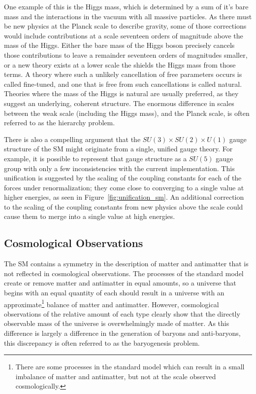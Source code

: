 One example of this is the Higgs mass, which is determined by a sum of it's bare mass and the interactions in the vacuum with all massive particles.
As there must be new physics at the Planck scale to describe gravity, some of those corrections would include contributions at a scale seventeen orders of magnitude above the mass of the Higgs.
Either the bare mass of the Higgs boson precisely cancels those contributions to leave a remainder seventeen orders of magnitudes smaller, or a new theory exists at a lower scale the shields the Higgs mass from those terms.
A theory where such a unlikely cancellation of free parameters occurs is called fine-tuned, and one that is free from such cancellations is called natural.
Theories where the mass of the Higgs is natural are usually preferred, as they suggest an underlying, coherent structure.
The enormous difference in scales between the weak scale (including the Higgs mass), and the Planck scale, is often referred to as the hierarchy problem.

There is also a compelling argument that the $SU(3)\times SU(2) \times U(1)$ gauge structure of the \ac{SM} might originate from a single, unified gauge theory.
For example, it is possible to represent that gauge structure as a $SU(5)$ gauge group with only a few inconsistencies with the current implementation.
This unification is suggested by the scaling of the coupling constants for each of the forces under renormalization; they come close to converging to a single value at higher energies, as seen in Figure~\ref{fig:unification_sm}. 
An additional correction to the scaling of the coupling constants from new physics above the \TeV scale could cause them to merge into a single value at high energies. 

\subsection{Cosmological Observations}

The \ac{SM} contains a symmetry in the description of matter and antimatter that is not reflected in cosmological observations.
The processes of the standard model create or remove matter and antimatter in equal amounts, so a universe that begins with an equal quantity of each should result in a universe with an approximate\footnote{There are some processes in the standard model which can result in a small imbalance of matter and antimatter, but not at the scale observed cosmologically.} balance of matter and antimatter.
However, cosmological observations of the relative amount of each type clearly show that the directly observable mass of the universe is overwhelmingly made of matter.
As this difference is largely a difference in the generation of baryons and anti-baryons, this discrepancy is often referred to as the baryogenesis problem.

